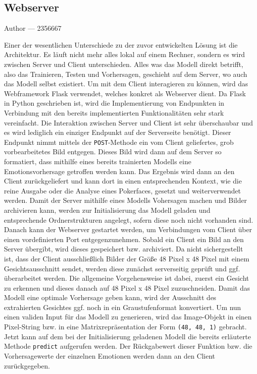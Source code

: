 \documentclass[12pt, a4paper]{report}
\makeatletter
\newcommand{\sectionauthor}[1]{%
  {\parindent0pt\vspace*{-5pt}%
  \large{Author --- }
  \linespread{1.1}\large\scshape#1%
  \par\nobreak\vspace*{35pt} }
  \@afterheading%
}
\makeatother
\begin{document}
\subsection{Webserver}
\sectionauthor{2356667}
Einer der wesentlichen Unterschiede zu der zuvor entwickelten Lösung ist die Architektur. Es läuft nicht mehr alles lokal auf einem Rechner, sondern es wird zwischen Server und Client unterschieden. Alles was das Modell direkt betrifft, also das Trainieren, Testen und Vorhersagen, geschieht auf dem Server, wo auch das Modell selbst existiert. Um mit dem Client interagieren zu können, wird das Webframework Flask verwendet, welches konkret als Webserver dient. Da Flask in Python geschrieben ist, wird die Implementierung von Endpunkten in Verbindung mit den bereits implementierten Funktionalitäten sehr stark vereinfacht.\newline
Die Interaktion zwischen Server und Client ist sehr überschaubar und es wird lediglich ein einziger Endpunkt auf der Serverseite benötigt. Dieser Endpunkt nimmt mittels der \texttt{POST}-Methode ein vom Client geliefertes, grob vorbearbeitetes Bild entgegen. Dieses Bild wird dann auf dem Server so formatiert, dass mithilfe eines bereits trainierten Modells eine Emotionsvorhersage getroffen werden kann. Das Ergebnis wird dann an den Client zurückgeliefert und kann dort in einen entsprechenden Kontext, wie die reine Ausgabe oder die Analyse eines Pokerfaces, gesetzt und weiterverwendet werden.\newline
Damit der Server mithilfe eines Modells Vohersagen machen und Bilder archivieren kann, werden zur Initialisierung das Modell geladen und entsprechende Ordnerstrukturen angelegt, sofern diese noch nicht vorhanden sind. Danach kann der Webserver gestartet werden, um Verbindungen vom Client über einen vordefinierten Port entgegenzunehmen. Sobald ein Client ein Bild an den Server übergibt, wird dieses gespeichert bzw. archiviert. Da nicht sichergestellt ist, dass der Client ausschließlich Bilder der Größe 48 Pixel x 48 Pixel mit einem Gesichtsausschnitt  sendet, werden diese zunächst serverseitig geprüft und ggf. überarbeitet werden.  
Die allgemeine Vorgehensweise ist dabei, zuerst ein Gesicht zu erkennen und dieses danach auf 48 Pixel x 48 Pixel zuzuschneiden. Damit das Modell eine optimale Vorhersage geben kann, wird der Ausschnitt des extrahierten Gesichtes ggf. noch in ein Graustufenformat konvertiert. Um nun einen validen Input für das Modell zu generieren, wird das Image-Objekt in einen Pixel-String bzw. in eine Matrixrepräsentation der Form \texttt{(48, 48, 1)} gebracht. Jetzt kann auf dem bei der Initialisierung geladenen Modell die bereits erläuterte Methode \texttt{predict} aufgerufen werden. Der Rückgabewert dieser Funktion bzw. die Vorhersagewerte der einzelnen Emotionen werden dann an den Client zurückgegeben.
\end{document}
